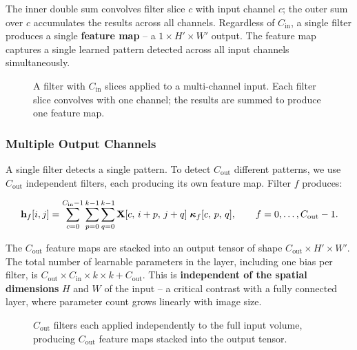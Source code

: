 The inner double sum convolves filter slice $c$ with input channel $c$; the outer sum over $c$ accumulates the results across all channels. Regardless of $C_{\mathrm{in}}$, a single filter produces a single \textbf{feature map} -- a $1 \times H' \times W'$ output. The feature map captures a single learned pattern detected across all input channels simultaneously.

\begin{figure}[h]
    \centering
    \resizebox{0.65\textwidth}{!}{}
    \caption{A filter with $C_{\mathrm{in}}$ slices applied to a multi-channel input. Each filter slice convolves with one channel; the results are summed to produce one feature map.}
    \label{fig:conv_channels}
\end{figure}

\subsubsection{Multiple Output Channels}

A single filter detects a single pattern. To detect $C_{\mathrm{out}}$ different patterns, we use $C_{\mathrm{out}}$ independent filters, each producing its own feature map. Filter $f$ produces:

\begin{equation}
    \mathbf{h}_f[i,j] = \sum_{c=0}^{C_{\mathrm{in}}-1}\sum_{p=0}^{k-1}\sum_{q=0}^{k-1}
    \mathbf{X}[c,\, i+p,\, j+q]\; \boldsymbol{\kappa}_f[c,\, p,\, q],
    \qquad f = 0,\ldots,C_{\mathrm{out}}-1.
    \label{eq:conv2d_multiout}
\end{equation}

The $C_{\mathrm{out}}$ feature maps are stacked into an output tensor of shape $C_{\mathrm{out}} \times H' \times W'$. The total number of learnable parameters in the layer, including one bias per filter, is $C_{\mathrm{out}} \times C_{\mathrm{in}} \times k \times k + C_{\mathrm{out}}$. This is \textbf{independent of the spatial dimensions} $H$ and $W$ of the input -- a critical contrast with a fully connected layer, where parameter count grows linearly with image size.

\begin{figure}
    \centering
    \resizebox{0.43\textwidth}{!}{}
    \caption{$C_{\mathrm{out}}$ filters each applied independently to the full input volume, producing $C_{\mathrm{out}}$ feature maps stacked into the output tensor.}
    \label{fig:conv_filters}
\end{figure}

